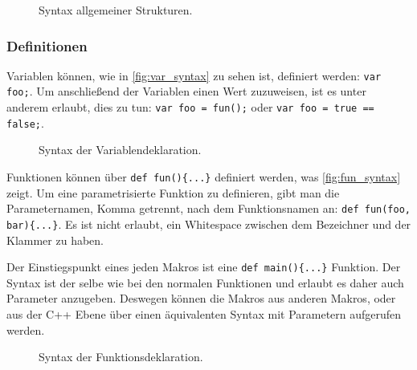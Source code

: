       \begin{figure}[H]
        \centering
        \caption{Syntax allgemeiner Strukturen.}
        \label{fig:common_syntax}
      \end{figure}


    \subsubsection{Definitionen}
    \label{sssec:Definitionen}
      Variablen können, wie in \autoref{fig:var_syntax} zu sehen ist, definiert werden: \lstinline[style=MyMacroStyleIn]$var foo;$. Um anschließend der Variablen einen Wert zuzuweisen, ist es unter anderem erlaubt, dies zu tun: \lstinline[style=MyMacroStyleIn]$var foo = fun();$ oder \lstinline[style=MyMacroStyleIn]$var foo = true == false;$.
      \begin{figure}[H]
        \centering
        \caption{Syntax der Variablendeklaration.}
        \label{fig:var_syntax}
      \end{figure}

      Funktionen können über \lstinline[style=MyMacroStyleIn]$def fun(){...}$ definiert werden, was \autoref{fig:fun_syntax} zeigt. Um eine parametrisierte Funktion zu definieren, gibt man die Parameternamen, Komma getrennt, nach dem Funktionsnamen an:
      \lstinline[style=MyMacroStyleIn]$def fun(foo, bar){...}$. %
      Es ist nicht erlaubt, ein Whitespace zwischen dem Bezeichner und der Klammer zu haben.

      Der Einstiegspunkt eines jeden Makros ist eine \lstinline[style=MyMacroStyleIn]$def main(){...}$ Funktion. Der Syntax ist der selbe wie bei den normalen Funktionen und erlaubt es daher auch Parameter anzugeben. Deswegen können die Makros aus anderen Makros, oder aus der C++ Ebene über einen äquivalenten Syntax mit Parametern aufgerufen werden.
      \begin{figure}[H]
        \centering
        \caption{Syntax der Funktionsdeklaration.}
        \label{fig:fun_syntax}
      \end{figure}

